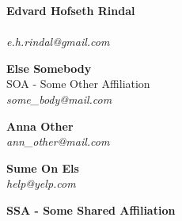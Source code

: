\begin{multicols}{2}
\textbf{Edvard Hofseth Rindal}\\
\\
\textit{e.h.rindal@gmail.com}

\textbf{Else Somebody}\\
SOA - Some Other Affiliation\\
\textit{some\_body@mail.com}
\end{multicols}




\begin{multicols}{2}
\textbf{Anna Other}\\
\textit{ann\_other@mail.com}

\textbf{Sume On Els}\\
\textit{help@yelp.com}
\end{multicols}
\textbf{SSA - Some Shared Affiliation}